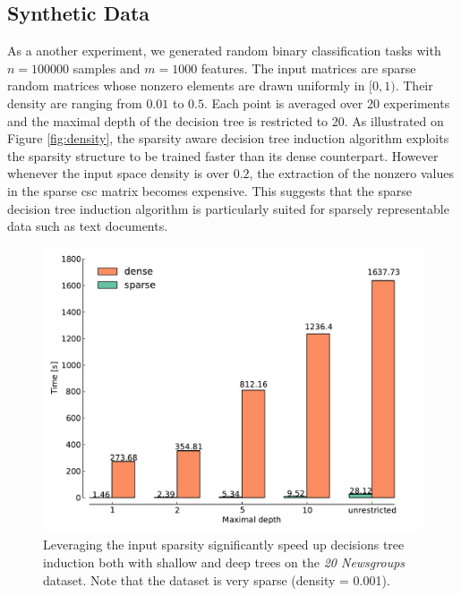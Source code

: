 \subsection{Synthetic Data}


As a another experiment, we generated random binary classification tasks with
$n=100000$ samples and $m=1000$ features. The input matrices are sparse random
matrices whose nonzero elements are drawn uniformly in $[0, 1)$. Their density
are ranging from $0.01$ to $0.5$. Each point is averaged over 20 experiments
and the maximal depth of the decision tree is restricted to 20. As illustrated
on Figure \ref{fig:density}, the sparsity aware decision tree induction
algorithm exploits the sparsity structure to be trained faster than its dense
counterpart. However whenever the input space density is over $0.2$, the
extraction of the nonzero values in the sparse csc matrix becomes expensive.
This suggests that the sparse decision tree induction algorithm is particularly
suited for sparsely representable data such as text documents.






\begin{figure}[h]
\centering
\includegraphics[scale=0.45]{images/20news.pdf}
\caption{Leveraging the input sparsity significantly speed up decisions
         tree induction both with shallow and deep trees on the \emph{20 Newsgroups}
         dataset. Note that the dataset is very sparse (density = 0.001).}
\label{fig:20news}
\end{figure}

